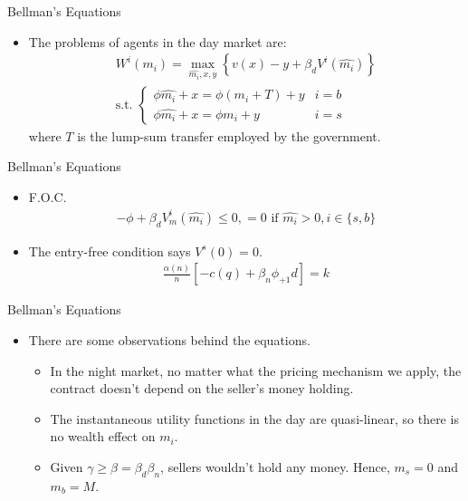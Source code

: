 \documentclass{beamer}
\begin{document}
\begin{frame}{Bellman's Equations}
    \begin{itemize}
        \item The problems of agents in the day market are:
        \begin{align*}
            W^{i}(m_{i}) = \max_{\hat{m_{i}},x,y}\left\{v(x)-y+\beta_{d}V^{i}(\hat{m_{i}})\right\}\\
            \text{s.t. } 
            \begin{cases}\phi \hat{m_{i}} + x = \phi(m_{i}+T)+y & i = b\\ \phi \hat{m_{i}} + x = \phi m_{i} +y & i = s\end{cases}
        \end{align*}
        where $T$ is the lump-sum transfer employed by the government.
    \end{itemize}
    
\end{frame}
\begin{frame}{Bellman's Equations}
    \begin{itemize}
        \item F.O.C.
        \begin{align*}
            -\phi+\beta_{d}V_{m}^{i}(\hat{m_{i}}) \leq 0, = 0 \text{ if } \hat{m_{i}} > 0, i \in \{s,b\}
        \end{align*}
        \item The entry-free condition says $V^{s}(0) = 0$.
        \begin{align*}
            \frac{\alpha(n)}{n}\left[ -c(q)+\beta_{n}\phi_{+1}d\right]  =k
        \end{align*}
    \end{itemize}
\end{frame}

\begin{frame}{Bellman's Equations}
    \begin{itemize}
        \item There are some observations behind the equations.
        \begin{itemize}
            \item In the night market, no matter what the pricing mechanism we apply, the contract doesn't depend on the seller's money holding.
            \item The instantaneous utility functions in the day are quasi-linear, so there is no wealth effect on $m_{i}$.
            \item Given $\gamma \geq \beta = \beta_{d}\beta_{n}$, sellers wouldn't hold any money. Hence, $m_{s} = 0$ and $m_{b} = M$.
        \end{itemize}
    \end{itemize}
\end{frame}
\end{document}
